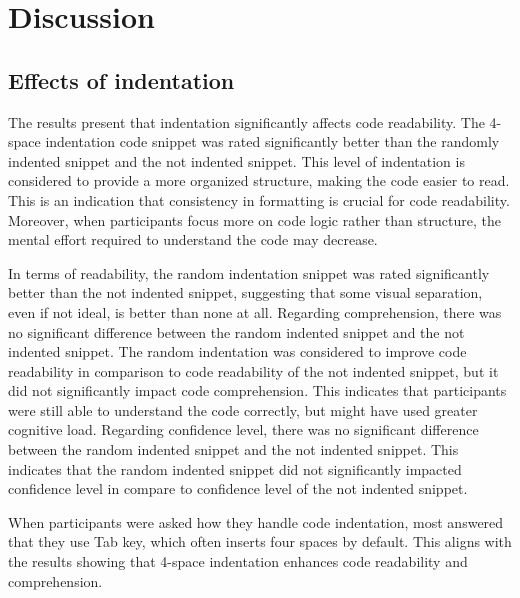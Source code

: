 \chapter{Discussion}



\section{Effects of indentation} 
The results present that indentation significantly affects code readability. The 4-space indentation code snippet was rated significantly better than the randomly indented snippet and the not indented snippet. This level of indentation is considered to provide a more organized structure, making the code easier to read. This is an indication that consistency in formatting is crucial for code readability. Moreover, when participants focus more on code logic rather than structure, the mental effort required to understand the code may decrease.


In terms of readability, the random indentation snippet was rated significantly better than the not indented snippet, suggesting that some visual separation, even if not ideal, is better than none at all.  Regarding comprehension, there was no significant difference between the random indented snippet and the not indented snippet. The random indentation was considered to improve code readability in comparison to code readability of the not indented snippet, but it did not significantly impact code comprehension.  This indicates that participants were still able to understand the code correctly, but might have used greater cognitive load. Regarding confidence level, there was no significant difference between the random indented snippet and the not indented snippet. This indicates that the random indented snippet did not significantly impacted confidence level in compare to confidence level of the not indented snippet. 

When participants were asked how they handle code indentation, most answered that they use Tab key, which often inserts four spaces by default.  This aligns with the results showing that 4-space indentation enhances code readability and comprehension. 

